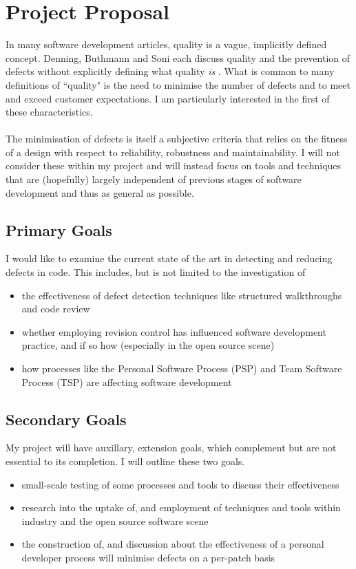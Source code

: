 \section{Project Proposal}

In many software development articles, quality is a vague, implicitly defined
concept.
Denning, Buthmann and Soni each discuss quality and the prevention of defects without explicitly
defining what quality {\em is} \cite{Soni:2010:DP, Buthmann:2010:CQ,
	Denning:1992:ESQ:129617.384272}.
What is common to many definitions of ``quality" is the need to minimise the number of defects and to
meet and exceed customer expectations.
I am particularly interested in the first of these characteristics.\\
\\
The minimisation of defects is itself a subjective criteria that relies on the fitness of a design
with respect to reliability, robustness and maintainability.
I will not consider these within my project and will instead focus on tools and techniques that are
(hopefully) largely independent of previous stages of software development and thus as general as
possible.

\subsection{Primary Goals}

I would like to examine the current state of the art in detecting and reducing defects in code.
This includes, but is not limited to the investigation of
\begin{itemize}
	\item the effectiveness of defect detection techniques like structured walkthroughs and code
	review
	\item whether employing revision control has influenced software development practice, and if so
	how (especially in the open source scene)
	\item how processes like the Personal Software Process (PSP) and Team Software Process (TSP) are
	affecting software development
\end{itemize}

\subsection{Secondary Goals}

My project will have auxillary, extension goals, which complement but are not essential to its
completion.
I will outline these two goals.
\begin{itemize}
	\item small-scale testing of some processes and tools to discuss their effectiveness
	\item research into the uptake of, and employment of techniques and tools within industry and the
	open source software scene
	\item the construction of, and discussion about the effectiveness of a personal developer process
	will minimise defects on a per-patch basis
\end{itemize}
